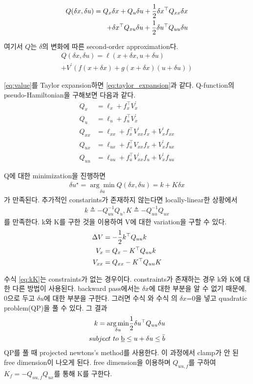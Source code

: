 \documentclass[journal]{IEEEtran}
\begin{document}
\begin{align}
	Q(\delta x,\delta u)=Q_x\delta x +Q_u \delta u +{1\over2} \delta x^{\top}Q_{xx}\delta x\nonumber\\
	+\delta x^{\top}Q_{xu}\delta u+{1 \over 2}\delta u^{\top}Q_{uu}\delta u	
	\label{eq:Q_second_order_approximation}
\end{align}

여기서 $Q$는 $\delta$의 변화에 따른 second-order approximation다.
\begin{align}
	Q(\delta x,\delta u) =\ell(x+\delta x,u+\delta u)\nonumber\\+V^{\prime}(f(x+\delta x)+g(x+\delta x)(u+\delta u))
	\label{eq:taylor_expansion}
\end{align}

\eqref{eq:value}를 Taylor expansion하면 \eqref{eq:taylor_expansion}과 같다. Q-function의 pseudo-Hamiltonian을 구해보면 다음과 같다.
\begin{align}
	Q_x&=\ell_x+f_x^{\top}V_x^{\prime} \nonumber\\
	Q_u&=\ell_u+f_u^{\top}V_x^{\prime} \nonumber\\
	Q_{xx}&=\ell_{xx}+f_x^{\top}V_{xx}^{\prime}f_x+V_x^{\prime}f_{xx}\nonumber\\
	Q_{ux}&=\ell_{ux}+f_u^{\top}V_{xx}f_x+V_x^{\prime}f_{ux}\nonumber\\
	Q_{uu}&=\ell_{uu}+f_u^{\top}V_{xx}^{\prime}f_u+V_x^{\prime}f_{uu}
	\label{eq:hamitonian}
\end{align}

Q에 대한 minimization을 진행하면
\begin{align}
 	\delta u ^{\star}=\underset{\delta u}{\arg\min} Q(\delta x,\delta u)=k+K\delta x
 	\label{eq:delta_u}
\end{align}
 가 만족된다.
추가적인 constarints가 존재하지 않는다면 locally-linear한 상황에서
\begin{align}
	k\triangleq-Q_{uu}^{-1}Q_u,
	K\triangleq-Q_{uu}^{-1}Q_{ux}
	\label{eq:kK}
\end{align}
를 만족한다.
k와 K를 구한 것을 이용하여 V에 대한 variation을 구할 수 있다.
\begin{align}
\Delta V&=-{1 \over2}k^{\top}Q_{uu}k\nonumber\\
V_x&=Q_x-K^{\top}Q_{uu}k\nonumber\\
V_{xx}&=Q_{xx}-K^{\top}Q_{uu}K
\label{eq:V_variation}
\end{align}

수식 \ref{eq:kK}는 constraints가 없는 경우이다. constraints가 존재하는 경우 k와 K에 대한 다른 방법이 사용된다. backward pass에서는 $\delta x$에 대한 부분을 알 수 없기 때문에, 0으로 두고 $ \delta u$에 대한 부분을 구한다. 그러면 수식 와 수식 의 $\delta x$=0을 넣고 quadratic problem(QP)을 풀 수 있다.
그 결과
\begin{align*}
	k=\underset{\delta u}{\arg\min} {1 \over 2}\delta u^{\top}Q_{uu}\delta u\\
	subject \  to\  \underbar{b} \leq u+\delta u \leq \bar{b}
\end{align*}
QP를 풀 때 projected newtons's method를 사용한다. 이 과정에서 clamp가 안 된 free dimension이 나오게 된다. free dimension을 이용하며 $Q_{uu,f}$를 구하여 $K_f=-Q_{uu,f}Q_{ux}$를 통해 K를 구한다.
\end{document}
